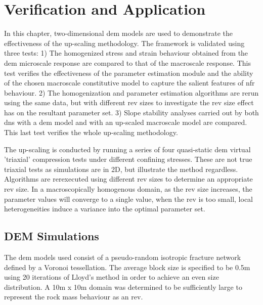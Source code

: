 \chapter{Verification and Application}
In this chapter, two-dimensional \acrshort{dem} models are used to demonstrate the effectiveness of the up-scaling methodology. The framework is validated using three tests: 1) The homogenized stress and strain behaviour obtained from the \acrshort{dem} microscale response are compared to that of the macroscale response. This test verifies the effectiveness of the parameter estimation module and the ability of the chosen macroscale constitutive model to capture the salient features of \acrshort{nfr} behaviour. 2) The homogenization and parameter estimation algorithms are rerun using the same data, but with different \acrshort{rev} sizes to investigate the \acrshort{rev} size effect has on the resultant parameter set. 3) Slope stability analyses carried out by both \acrfull{dns} with a \acrshort{dem} model and with an up-scaled macroscale model are compared. This last test verifies the whole up-scaling methodology.

The up-scaling is conducted by running a series of four quasi-static \acrshort{dem} virtual 'triaxial' compression tests under different confining stresses. These are not true triaxial tests as simulations are in 2D, but illustrate the method regardless. Algorithms are rerexecuted using different \acrshort{rev} sizes to determine an appropriate \acrshort{rev} size. In a macroscopically homogenous domain, as the \acrshort{rev} size increases, the parameter values will converge to a single value, when the \acrshort{rev} is too small, local heterogeneities induce a variance into the optimal parameter set.

\section{DEM Simulations}

The \acrshort{dem} models used consist of a pseudo-random isotropic fracture network defined by a Voronoi tessellation. The average block size is specified to be 0.5m using 20 iterations of Lloyd's method \citep{Lloyd_1982} in order to achieve an even size distribution. A 10m x 10m domain was determined to be sufficiently large to represent the rock mass behaviour as an \acrshort{rev}. 

